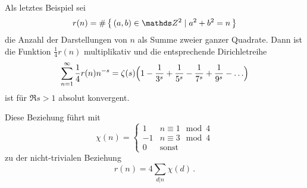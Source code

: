 Als letztes Beispiel sei
\[
r(n) = \# \Set{ (a,b) \in \ZZ^2 \mid a^2 + b^2 = n}
\]
die Anzahl der Darstellungen von $n$ als Summe zweier ganzer Quadrate.
Dann ist die Funktion $\frac{1}{4}r(n)$ multiplikativ und die entsprechende Dirichletreihe
\[
\sum_{n=1}^\infty \frac{1}{4} r(n) n^{-s}
= \zeta(s) \Bigl( 1 - \frac{1}{3^s} + \frac{1}{5^s} - \frac{1}{7^s} + \frac{1}{9^s} - \ldots \Bigr)
\]
ist für $\Re s > 1$ absolut konvergent.

Diese Beziehung führt mit 
\[
\chi(n)
= \begin{cases}
1 & n \equiv 1 \mod 4 \\
-1 & n \equiv 3 \mod 4 \\
0 & \text{sonst}
\end{cases}
\]
zu der nicht-trivialen Beziehung
\[
r(n) = 4\sum_{d|n} \chi(d)
\,.
\]